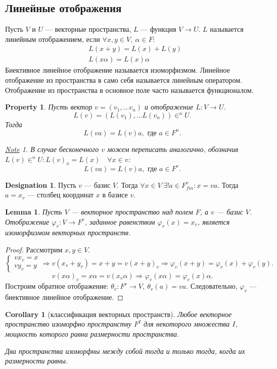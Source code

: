 \documentclass[11pt]{book}
\theoremstyle{definition}
\theoremstyle{plain}
\theoremstyle{plain}
\newtheorem{lm}{Lemma}
\newtheorem*{prop}{Property}
\newtheorem{cor}{Corollary}
\theoremstyle{definition}
\newtheorem*{name}{Designation}
\theoremstyle{remark}
\newtheorem*{note}{\underline{Note}}
\begin{document}
\subsection{Линейные отображения}
\begin{defn}
    Пусть $ V$ и  $ U$ --- векторные пространства,  $ L$ --- функция  $ V \to  U$. $ L$ называется {\sf линейным отображением}, если
    $
    \forall x, y \in V, ~ \alpha \in F:
    $
    \[
	\begin{aligned}
	    & L(x+y) = L(x) + L(y) \\
	    & L(x\alpha) = L(x) \alpha
	\end{aligned}
    \]
    Биективное линейное отображение называется {\sf изоморфизмом}.
    Линейное отображение из пространства в само себя называется {\sf линейным оператором}.
    Отображение из пространства в основное поле часто называется {\sf функционалом}.
\end{defn}
\begin{prop}
    Пусть вектор $ v = (v_1, \ldots v_n)$ и  отображение $ L: V \to U$. \[
	L(v) = (L(v_1), \ldots L(v_n)) \in ^n\!\!U
    .\]
    Тогда
    \[
	L(va) = L(v)a, \text{ где } a \in F^{n}
    .\]
    \begin{note}
	В случае бесконечного $ v$ можем переписать аналогично, обозначив  $ L(v) \in ^n\!\!U: L(v)_x = L(x) \quad \forall x \in v$:
	\[
	    L(va) = L(v)a, \text{ где } a \in F^{v}
	.\]
    \end{note}
\end{prop}
\begin{name}
    Пусть $ v$ --- базис  $ V$. Тогда  $ \forall x \in V ~ \exists ! a \in F_{fin}^{v}: x = va$.
    Тогда $ a = x_v$ --- столбец координат  $ x$ в базисе  $ v$.
\end{name}
\begin{lm}
    Пусть $ V$ --- векторное пространство над полем  $ F$, а  $ v$ --- базис  $ V$. Отображение  $ \varphi _v: V \to  F^{v}$, заданное равенством $ \varphi _v(x) = x_{v}$, является изоморфизмом векторных пространств.
\end{lm}
\begin{proof}
    Рассмотрим $ x, y \in V$.
    \[
	\begin{cases}
	    v x_v = x \\
	    v y_v = y
	\end{cases}
	\Longrightarrow v(x_v + y_v) = x+y = v(x+y)_v \Longrightarrow \varphi_v (x+y) = \varphi_v (x) + \varphi_v (y)
    .\]
    \[
	v(x\alpha)_v = x\alpha = v(x_v \alpha) \Longrightarrow  \varphi_v (x\alpha) = \varphi_v(x)\alpha
    .\]
    Построим обратное отображение:
    $ \theta_v: F^{v} \to  V, ~ \theta_v(a) = va$.
    Следовательно, $ \varphi _v$ --- биективное линейное отображение.
\end{proof}
\begin{cor}[классификация векторных пространств]
    Любое векторное пространство изоморфно пространству $ F^{I}$ для некоторого множества $ I$, мощность которого равна размерности пространства.

    Два пространства изоморфны между собой  тогда и только тогда, когда их размерности равны.
\end{cor}
\end{document}
